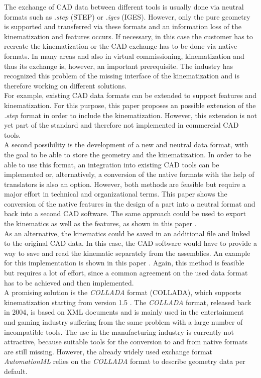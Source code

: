    The exchange of CAD data between different tools is usually done via neutral formats such as \textit{.step} (\acl{STEP}) or \textit{.iges} (\acl{IGES}). However, only the pure geometry is supported and transferred via these formats and an information loss of the kinematization and features occurs. If necessary, in this case the customer has to recreate the kinematization or the CAD exchange has to be done via native formats. In many areas and also in virtual commissioning, kinematization and thus its exchange is, however, an important prerequisite. The industry has recognized this problem of the missing interface of the kinematization and is therefore working on different solutions. \\
    For example, existing CAD data formats can be extended to support features and kinematization. For this purpose, this paper \cite{StepWithKin} proposes an possible extension of the \textit{.step} format in order to include the kinematization. However, this extension is not yet part of the standard and therefore not implemented in commercial CAD tools.  \\
    A second possibility is the development of a new and neutral data format, with the goal to be able to store the geometry and the kinematization. In order to be able to use this format, an integration into existing CAD tools can be implemented or, alternatively, a conversion of the native formats with the help of translators is also an option. However, both methods are feasible but require a major effort in technical and organizational terms. This paper \cite{PaperCADFeatureTranslator} shows the conversion of the native features in the design of a part into a neutral format and back into a second CAD software. The same approach could be used to export the kinematics as well as the features, as shown in this paper \cite{PaperCADConstrainTranslator}. \\
    As an alternative, the kinematics could be saved in an additional file and linked to the original CAD data. In this case, the CAD software would have to provide a way to save and read the kinematic separately from the assemblies. An example for this implementation is shown in this paper \cite{PaperConstrainWithStepAndXml}. Again, this method is feasible but requires a lot of effort, since a common agreement on the used data format has to be achieved and then implemented. \\
    A promising solution is the \textit{COLLADA} format (\acl{COLLADA}), which supports kinematization starting from version 1.5 \cite{ColladaSpecification}. The \textit{COLLADA} format, released back in 2004, is based on XML documents and is mainly used in the entertainment and gaming industry suffering from the same problem with a large number of incompatible tools. The use in the manufacturing industry is currently not attractive, because suitable tools for the conversion to and from native formats are still missing. However, the already widely used exchange format \textit{AutomationML} relies on the \textit{COLLADA} format to describe geometry data per default. 
    

